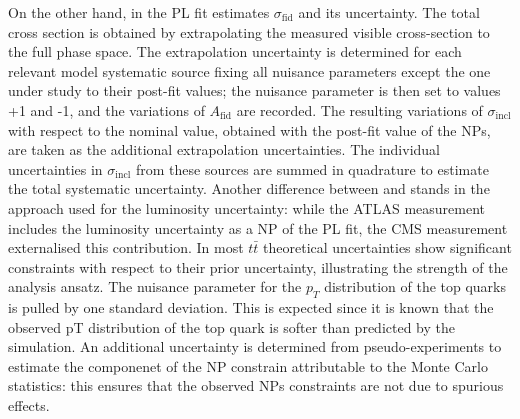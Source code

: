 \documentclass[12pt]{article}
\begin{document}
On the other hand, in \cite{CMS_inclusive} the PL fit estimates $\sigma_{\mathrm{fid}}$ and its uncertainty. The total cross section is obtained by extrapolating the measured visible cross-section to the full phase space. The extrapolation uncertainty is determined for each relevant model systematic source fixing all nuisance parameters except the one under study to their post-fit values; the nuisance parameter is then set to values +1 and -1, and the variations of $A_{\mathrm{fid}}$ are recorded. The resulting variations of $\sigma_{\mathrm{incl}}$ with respect to the nominal value, obtained with the post-fit value of the NPs, are taken as the additional extrapolation uncertainties. The individual uncertainties in $\sigma_{\mathrm{incl}}$ from these sources are summed in quadrature to estimate the total systematic uncertainty.
Another difference between \cite{Aad_2020} and \cite{CMS_inclusive} stands in the approach used for the luminosity uncertainty: while the ATLAS measurement includes the luminosity uncertainty as a NP of the PL fit, the CMS measurement externalised this contribution.
In \cite{CMS_inclusive} most $t\bar{t}$ theoretical uncertainties show significant constraints with respect to their prior uncertainty, illustrating the strength of the analysis ansatz. The nuisance parameter for the $p_T$ distribution of the top quarks is pulled by one standard deviation. This is expected since it is known that the observed pT distribution of the top quark is softer than predicted by the simulation. An additional uncertainty is determined from pseudo-experiments to estimate the componenet of the NP constrain attributable to the Monte Carlo statistics: this ensures that the observed NPs constraints are not due to spurious effects.
\end{document}
